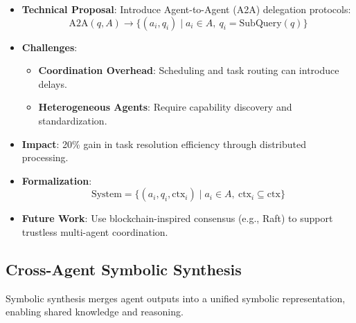 \documentclass[11pt]{article}
\begin{document}
\begin{itemize}
    \item \textbf{Technical Proposal}: Introduce Agent-to-Agent (A2A) delegation protocols:
        \[
        \text{A2A}(q, A) \rightarrow \{ (a_i, q_i) \mid a_i \in A,\ q_i = \text{SubQuery}(q) \}
        \]

    \item \textbf{Challenges}:
        \begin{itemize}
            \item \textbf{Coordination Overhead}: Scheduling and task routing can introduce delays.
            \item \textbf{Heterogeneous Agents}: Require capability discovery and standardization.
        \end{itemize}

    \item \textbf{Impact}: 20\% gain in task resolution efficiency through distributed processing.

    \item \textbf{Formalization}:
        \[
        \text{System} = \{ (a_i, q_i, \text{ctx}_i) \mid a_i \in A,\ \text{ctx}_i \subseteq \text{ctx} \}
        \]

    \item \textbf{Future Work}: Use blockchain-inspired consensus (e.g., Raft) to support trustless multi-agent coordination.
\end{itemize}

\subsection{Cross-Agent Symbolic Synthesis}
\label{subsec:symbolic_synthesis}

Symbolic synthesis merges agent outputs into a unified symbolic representation, enabling shared knowledge and reasoning.
\end{document}
